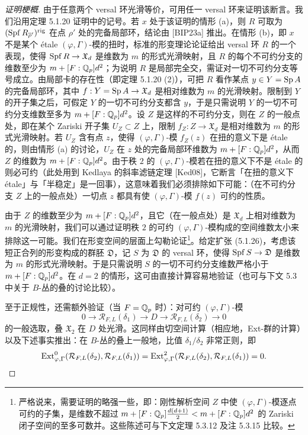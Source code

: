 \begin{proof}[证明梗概]
由于任意两个 versal 环光滑等价，可用任一 versal 环来证明该断言。我们沿用定理 5.1.20 证明中的记号。若 $x$ 处于该证明的情形 (a)，则 $R$ 可取为 $(\operatorname{Spf} R_{\overline{\rho}'})^{\mathrm{rig}}$ 在点 $\rho'$ 处的完备局部环，结论由 [BIP23a] 推出。在情形 (b)，即 $x$ 不是某个 étale $(\varphi,\Gamma)$-模的扭时，标准的形变理论论证给出 versal 环 $R$ 的一个表现，使得 $\operatorname{Spf} R\to\mathfrak{X}_d$ 是维数为 $m$ 的形式光滑映射，且 $R$ 的每个不可约分支的维数至少为 $m+[F:\mathbb{Q}_p]d^2$；为说明 $R$ 是局部完全交，需证对一切不可约分支等号成立。由局部卡的存在性（即定理 5.1.20 (2)），可把 $R$ 看作某点 $y\in Y=\operatorname{Sp} A$ 的完备局部环，其中 $f:Y=\operatorname{Sp} A\to\mathfrak{X}_d$ 是相对维数为 $m$ 的光滑映射。限制到 $Y$ 的开子集之后，可假定 $Y$ 的一切不可约分支都含 $y$，于是只需说明 $Y$ 的一切不可约分支维数至多为 $m+[F:\mathbb{Q}_p]d^2$。设 $Z$ 是这样的不可约分支，则在 $Z$ 的一般点处，即在某个 Zariski 开子集 $U_Z\subset Z$ 上，限制 $f_Z:Z\to\mathfrak{X}_d$ 是相对维数为 $m$ 的形式光滑映射。若 $U_Z$ 含有点 $z$，使得 $(\varphi,\Gamma)$-模 $f_Z(z)$ 在扭的意义下是 étale 的，则由情形 (a) 的讨论，$U_Z$ 在 $z$ 处的完备局部环维数为 $m+[F:\mathbb{Q}_p]d^2$，从而 $Z$ 的维数为 $m+[F:\mathbb{Q}_p]d^2$。由于秩 $2$ 的 $(\varphi,\Gamma)$-模若在扭的意义下不是 étale 的则必可约（此处用到 Kedlaya 的斜率滤链定理 [Ked08]，它断言「在扭的意义下 étale」与「半稳定」是一回事），这意味着我们必须排除如下可能：（在不可约分支 $Z$ 上的一般点处）一切点 $z$ 都具有使 $(\varphi,\Gamma)$-模 $f(z)$ 可约的性质。

由于 $Z$ 的维数至少为 $m+[F:\mathbb{Q}_p]d^2$，且它（在一般点处）是 $\mathfrak{X}_d$ 上相对维数为 $m$ 的光滑映射，我们可以通过证明秩 $2$ 的可约 $(\varphi,\Gamma)$-模构成的空间维数太小来排除这一可能。我们在形变空间的层面上勾勒论证\footnote{严格说来，需要证明的略强一些，即：刚性解析空间 $Z$ 中使 $(\varphi,\Gamma)$-模逐点可约的子集，是维数不超过 $m+[F:\mathbb{Q}_p]\frac{d(d+1)}{2}<m+[F:\mathbb{Q}_p]d^2$ 的 Zariski 闭子空间的至多可数并。这些陈述可与下文定理 5.3.12 及注 5.3.15 比较。}。给定扩张 (5.1.26)，考虑该短正合列的形变构成的群胚 $\mathfrak{D}$，记 $S$ 为 $\mathfrak{D}$ 的 versal 环，使得 $\operatorname{Spf} S\to\mathfrak{D}$ 是维数为 $m$ 的形式光滑映射。于是只需说明 $S$ 的一切不可约分支维数严格小于 $m+[F:\mathbb{Q}_p]d^2$。在 $d=2$ 的情形，这可由直接计算容易地验证（也可与下文 5.3 中关于 $B$-丛的叠的讨论比较）。

至于正规性，还需额外验证（当 $F=\mathbb{Q}_p$ 时）：对可约 $(\varphi,\Gamma)$-模
\[
0\to\mathcal{R}_{F,L}(\delta_1)\to D\to\mathcal{R}_{F,L}(\delta_2)\to0
\]
的一般选取，叠 $\mathfrak{X}_2$ 在 $D$ 处光滑。这同样由切空间计算（相应地，Ext-群的计算）以及下述事实推出：在 $B$-丛的叠上一般地，比值 $\delta_1/\delta_2$ 非常正则，即
\[
\operatorname{Ext}^0_{\varphi,\Gamma}(\mathcal{R}_{F,L}(\delta_2),\mathcal{R}_{F,L}(\delta_1))=\operatorname{Ext}^2_{\varphi,\Gamma}(\mathcal{R}_{F,L}(\delta_2),\mathcal{R}_{F,L}(\delta_1))=0.
\]
\end{proof}

